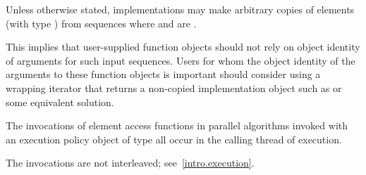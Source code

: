 \pnum
Unless otherwise stated, implementations may make arbitrary copies of elements
(with type ) from sequences where 
and  are .
\begin{note}
This implies that user-supplied function objects should not rely on object
identity of arguments for such input sequences. Users for whom the object
identity of the arguments to these function objects is important should
consider using a wrapping iterator that returns a non-copied implementation
object such as  or some equivalent
solution.
\end{note}

\pnum
The invocations of element access functions in parallel algorithms invoked with
an execution policy object of type  all occur
in the calling thread of execution.
\begin{note}
The invocations are not interleaved; see~\ref{intro.execution}.
\end{note}

